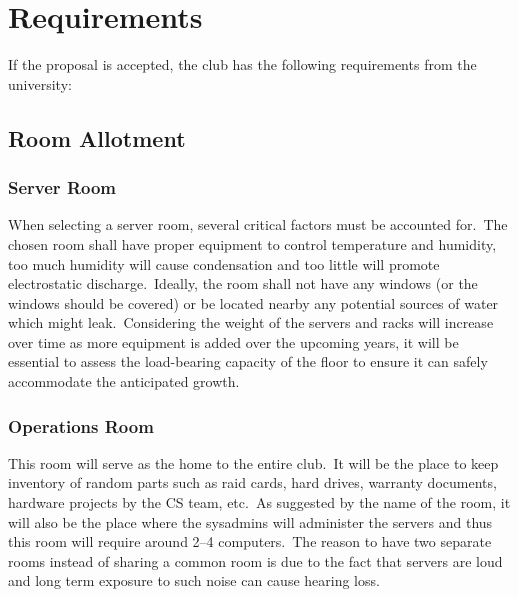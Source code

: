 \section{Requirements}\label{sec:requirements}
If the proposal is accepted, the club has the following requirements from the university:


\subsection{Room Allotment}\label{subsec:room-allotment}

\subsubsection{Server Room}
When selecting a server room, several critical factors must be accounted for.\ The chosen room shall have proper
equipment to control temperature and humidity, too much humidity will cause condensation and too little will promote
electrostatic discharge.\ Ideally, the room shall not have any windows (or the windows should be covered) or be located
nearby any potential sources of water which might leak.\ Considering the weight of the servers and racks will increase
over time as more equipment is added over the upcoming years, it will be essential to assess the load-bearing capacity
of the floor to ensure it can safely accommodate the anticipated growth.

\subsubsection{Operations Room}
This room will serve as the home to the entire club.\ It will be the place to keep inventory of random parts such as
raid cards, hard drives, warranty documents, hardware projects by the CS team, etc.\ As suggested by the name of the
room, it will also be the place where the sysadmins will administer the servers and thus this room will require around
2--4 computers.\ The reason to have two separate rooms instead of sharing a common room is due to the fact that servers
are loud and long term exposure to such noise can cause hearing loss.
